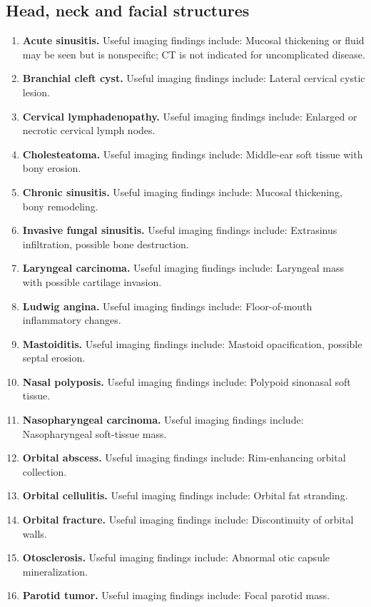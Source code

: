 \subsection{Head, neck and facial structures}
\begin{enumerate}[leftmargin=*,itemsep=0.45em,topsep=0.4em]
\item \textbf{Acute sinusitis.} Useful imaging findings include: Mucosal thickening or fluid may be seen but is nonspecific; CT is not indicated for uncomplicated disease.
\item \textbf{Branchial cleft cyst.} Useful imaging findings include: Lateral cervical cystic lesion.
\item \textbf{Cervical lymphadenopathy.} Useful imaging findings include: Enlarged or necrotic cervical lymph nodes.
\item \textbf{Cholesteatoma.} Useful imaging findings include: Middle-ear soft tissue with bony erosion.
\item \textbf{Chronic sinusitis.} Useful imaging findings include: Mucosal thickening, bony remodeling.
\item \textbf{Invasive fungal sinusitis.} Useful imaging findings include: Extrasinus infiltration, possible bone destruction.
\item \textbf{Laryngeal carcinoma.} Useful imaging findings include: Laryngeal mass with possible cartilage invasion.
\item \textbf{Ludwig angina.} Useful imaging findings include: Floor-of-mouth inflammatory changes.
\item \textbf{Mastoiditis.} Useful imaging findings include: Mastoid opacification, possible septal erosion.
\item \textbf{Nasal polyposis.} Useful imaging findings include: Polypoid sinonasal soft tissue.
\item \textbf{Nasopharyngeal carcinoma.} Useful imaging findings include: Nasopharyngeal soft-tissue mass.
\item \textbf{Orbital abscess.} Useful imaging findings include: Rim-enhancing orbital collection.
\item \textbf{Orbital cellulitis.} Useful imaging findings include: Orbital fat stranding.
\item \textbf{Orbital fracture.} Useful imaging findings include: Discontinuity of orbital walls.
\item \textbf{Otosclerosis.} Useful imaging findings include: Abnormal otic capsule mineralization.
\item \textbf{Parotid tumor.} Useful imaging findings include: Focal parotid mass.

\end{enumerate}
